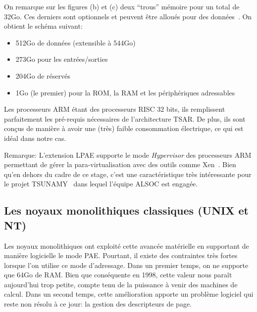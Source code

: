     On remarque sur les figures (b) et (c) deux ``trous'' mémoire pour un total
    de 32Go. Ces derniers sont optionnels et peuvent être alloués pour des
    données~\citep{arm2012principles}. On obtient le schéma suivant:

    \begin{itemize}
      \item 512Go de données (extensible à 544Go)
      \item 273Go pour les entrées/sorties
      \item 204Go de réservés
      \item 1Go (le premier) pour la ROM, la
        RAM et les périphériques adressables
    \end{itemize}

    Les processeurs ARM étant des processeurs RISC 32 bits, ils remplissent
    parfaitement les pré-requis nécessaires de l'architecture TSAR. De plus, ils
    sont conçus de manière à avoir une (très) faible consommation électrique, ce
    qui est idéal dans notre cas.

    \begin{paragraph}{Remarque:}
      L'extension LPAE supporte le mode \textit{Hypervisor} des processeurs ARM
      permettant de gérer la para-virtualisation avec des outils comme
      Xen~\cite{barham2003xen}. Bien qu'en dehors du cadre de ce stage, c'est
      une caractéristique très intéressante pour le projet
      TSUNAMY~\cite{tsunamy2013web} dans lequel l'équipe
      ALSOC
      est engagée.
    \end{paragraph}

    \subsection{Les noyaux monolithiques classiques (UNIX et NT)}

      Les noyaux monolithiques ont exploité cette avancée matérielle en
      supportant de manière logicielle le mode PAE. Pourtant, il existe des
      contraintes très fortes lorsque l'on utilise ce mode d'adressage. Dans un
      premier temps, on ne supporte que 64Go de RAM. Bien que conséquente en
      1998, cette valeur nous paraît aujourd'hui trop petite, compte tenu de la
      puissance à venir des machines de calcul.  Dans un second temps, cette
      amélioration apporte un problème logiciel qui reste non résolu à ce jour:
      la gestion des descripteurs de page.\\

